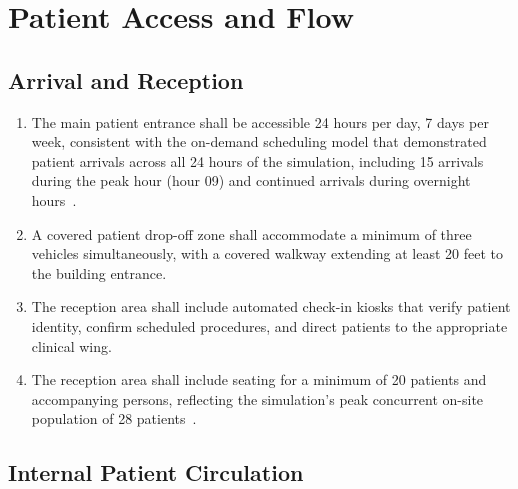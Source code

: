 \documentclass[11pt,letterpaper]{article}
\begin{document}
\section{Patient Access and Flow}

\subsection{Arrival and Reception}

\begin{enumerate}[label=(\alph*)]
\item The main patient entrance shall be accessible 24 hours per day, 7 days
  per week, consistent with the on-demand scheduling model that demonstrated
  patient arrivals across all 24 hours of the simulation, including 15
  arrivals during the peak hour (hour 09) and continued arrivals during
  overnight hours~\cite{newtrial2026}.

\item A covered patient drop-off zone shall accommodate a minimum of three
  vehicles simultaneously, with a covered walkway extending at least 20 feet
  to the building entrance.

\item The reception area shall include automated check-in kiosks that verify
  patient identity, confirm scheduled procedures, and direct patients to the
  appropriate clinical wing.

\item The reception area shall include seating for a minimum of 20 patients and
  accompanying persons, reflecting the simulation's peak concurrent on-site
  population of 28 patients~\cite{newtrial2026}.
\end{enumerate}

\subsection{Internal Patient Circulation}
\end{document}
